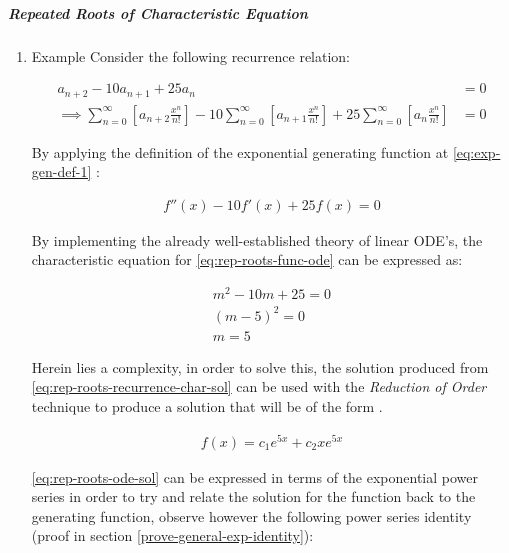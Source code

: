 \documentclass[11pt]{article}
\begin{document}
\subparagraph{Repeated Roots of Characteristic Equation}
\label{rep-roots-recurrence}
\begin{enumerate}
\item Example
\label{sec:org370dd94}
Consider the following recurrence relation:

\begin{align}
    a_{n+2} -  10a_{n+ 1} +  25a_{n}&= 0 \label{eq:hom-repeated-roots-recurrence} \\
    \implies  \sum^{\infty}_{n= 0}   {\left[{ a_{n+2} \frac{x^n}{n!} }\right]} - 10 \sum^{\infty}_{n= 0}   {\left[{ a_{n+1} \frac{x^n}{n!}    }\right]} + 25 \sum^{\infty}_{n= 0 }   {\left[{  a_{n}\frac{x^n}{n!} }\right]}&= 0 \nonumber
\end{align}

By applying the definition of the exponential generating function at \eqref{eq:exp-gen-def-1} :

\begin{align}
    f''{\left({ x }\right)}- 10f'{\left({ x }\right)}+  25f{\left({ x }\right)}= 0 \label{eq:rep-roots-func-ode}
\end{align}

By implementing the already well-established theory of linear ODE's, the
characteristic equation for \eqref{eq:rep-roots-func-ode} can be expressed as:

\begin{align}
    m^2- 10m+  25 = 0 \nonumber \\
    {\left({ m- 5 }\right)}^2 = 0 \nonumber \\
    m= 5 \label{eq:rep-roots-recurrence-char-sol}
\end{align}

Herein lies a complexity, in order to solve this, the solution produced from \eqref{eq:rep-roots-recurrence-char-sol} can be used with the \emph{Reduction of Order} technique to produce a solution that will be of the form \cite[]{zillMatrixExponential2009}.

\begin{align}
    f{\left({ x }\right)}= c_1e^{5x} +  c_2 x e^{5x} \label{eq:rep-roots-ode-sol}
\end{align}

\eqref{eq:rep-roots-ode-sol} can be expressed in terms of the exponential power series in order to try and relate the solution for the function back to the generating function,
observe however the following power series identity (proof in section \ref{prove-general-exp-identity}):


\end{enumerate}
\end{document}
